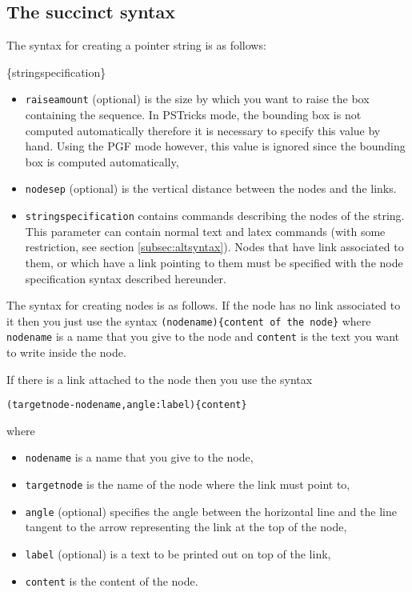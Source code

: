 \subsection{The succinct syntax}
The syntax for creating a pointer string is as follows:
\begin{command}{\Pstr[raiseamount][nodesep]\{stringspecification\}}
\begin{itemize}
\item  \verb|raiseamount| (optional) is the size by which you want
to raise the box containing the sequence. In 
PSTricks mode, the bounding box is not computed automatically therefore
it is necessary to specify this value by hand. Using the PGF mode
 however, this value is ignored since the bounding box
is computed automatically,
\item  \verb|nodesep| (optional) is the vertical distance between
the nodes and the links.
\item  \verb|stringspecification| contains commands describing the nodes
of the string. 
This parameter can contain normal text and latex commands (with some restriction, see section \ref{subsec:altsyntax}).
Nodes that have link associated to them, or which have a link pointing to them 
must be specified with the node specification syntax described hereunder.\end{itemize}
\end{command}

The syntax for creating nodes is as follows.
If the node has no link associated to it then you just use 
the syntax \verb|(nodename){content of the node}| where \verb|nodename| is a name that you give to the node and \verb|content| is the text you want to write inside the node.

If there is a link attached to the node then you use
the syntax 
\begin{verbatim}
(targetnode-nodename,angle:label){content}
\end{verbatim}
where
\begin{itemize}
\item \verb|nodename| is a name that you give to the node,
\item \verb|targetnode| is the name of the node where the link must point to, 
\item \verb|angle| (optional) specifies the angle between the horizontal line and the line
tangent to the arrow representing the link at the top of the node,
\item  \verb|label| (optional) is a text to be printed out on top of the link,
\item \verb|content| is the content of the node.
\end{itemize}

